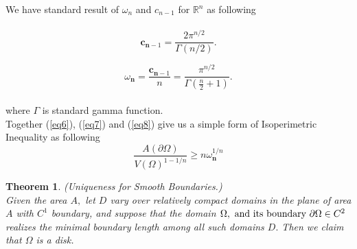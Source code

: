 \documentclass[oneside]{book}
\newtheorem{theorem}{Theorem}[section]
\begin{document}
	We have standard result of $\omega_{n}$ and $c_{n-1}$ for $\mathbb{R}^{n}$ as following  \\\\
	\begin{equation}
		\label{eq7}  
		\mathbf{c}_{\mathbf{n}-1} = \frac{2 \pi^{n / 2}}{\Gamma(n / 2)}.
	\end{equation}
	
	
	
	\begin{equation}
		\label{eq8}  
		\omega_{\mathbf{n} } = \frac{\mathbf{c}_{\mathbf{n}-1}}{n} =\frac{\pi^{n / 2}}{\Gamma\left(\frac{n}{2}+1\right)}.
	\end{equation} \\
	where $\Gamma$ is standard gamma function.\\
	Together (\ref{eq6}),
	(\ref{eq7}) and (\ref{eq8}) give us a simple form of Isoperimetric Inequality as following\\
	\begin{equation}
		\label{eq9}  
		\frac{A(\partial \Omega)}{V(\Omega)^{1-1 / n}} \geq n \omega_{\mathbf{n}}^{1 / n}
	\end{equation}
	
	
	
	
	
	
	\begin{theorem}
		{(Uniqueness for Smooth Boundaries.)}
		\label{t:1} \\
		Given
		the area $A,$ let $D$ vary over relatively compact domains in the plane of area $A$
		with $C^{1}$ boundary, and suppose that the domain $\Omega, \text{ and its boundary } \\
		\partial \Omega \in C^{2}$ realizes the minimal
		boundary length among all such domains $D .$ Then we claim that $\Omega$ is a disk.
	\end{theorem}
	
\end{document}

